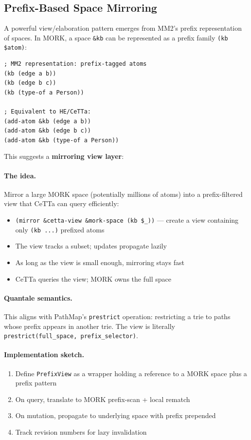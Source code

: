 \documentclass[11pt]{article}
\newcommand{\code}[1]{\texttt{#1}}
\newcommand{\PathMap}{\textup{PathMap}}
\newcommand{\MORK}{\textup{MORK}}
\begin{document}
\subsection{Prefix-Based Space Mirroring}
\label{sec:prefix-mirror}

A powerful view/elaboration pattern emerges from MM2's prefix representation
of spaces.  In \MORK{}, a space \code{\&kb} can be represented as a prefix
family \code{(kb \$atom)}:

\begin{lstlisting}
; MM2 representation: prefix-tagged atoms
(kb (edge a b))
(kb (edge b c))
(kb (type-of a Person))

; Equivalent to HE/CeTTa:
(add-atom &kb (edge a b))
(add-atom &kb (edge b c))
(add-atom &kb (type-of a Person))
\end{lstlisting}

This suggests a \textbf{mirroring view layer}:

\paragraph{The idea.}
Mirror a large \MORK{} space (potentially millions of atoms) into a
prefix-filtered view that CeTTa can query efficiently:
\begin{itemize}[nosep]
  \item \code{(mirror \&cetta-view \&mork-space (kb \$\_))} ---
    create a view containing only \code{(kb ...)} prefixed atoms
  \item The view tracks a subset; updates propagate lazily
  \item As long as the view is small enough, mirroring stays fast
  \item CeTTa queries the view; \MORK{} owns the full space
\end{itemize}

\paragraph{Quantale semantics.}
This aligns with \PathMap{}'s \code{prestrict} operation: restricting
a trie to paths whose prefix appears in another trie.  The view is
literally \code{prestrict(full\_space, prefix\_selector)}.

\paragraph{Implementation sketch.}
\begin{enumerate}[nosep]
  \item Define \code{PrefixView} as a wrapper holding a reference to
    a \MORK{} space plus a prefix pattern
  \item On query, translate to \MORK{} prefix-scan + local rematch
  \item On mutation, propagate to underlying space with prefix prepended
  \item Track revision numbers for lazy invalidation
\end{enumerate}
\end{document}
